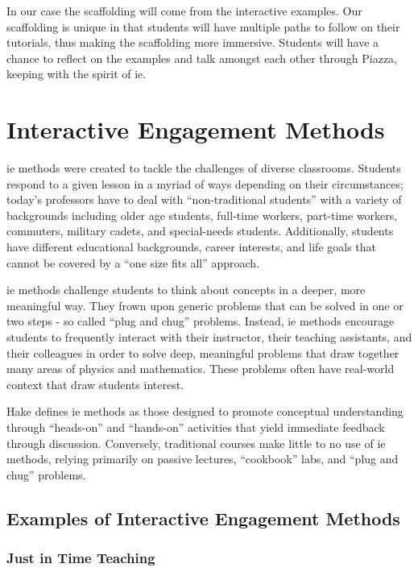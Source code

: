 In our case the scaffolding will come from the interactive examples. Our scaffolding is unique in that students will have multiple paths to follow on their tutorials, thus making the scaffolding more immersive. Students will have a chance to reflect on the examples and talk amongst each other through Piazza, keeping with the spirit of \gls{ie}.

\section{Interactive Engagement Methods}

\gls{ie} methods were created to tackle the challenges of diverse classrooms. Students respond to a given lesson in a myriad of ways depending on their circumstances; today's professors have to deal with ``non-traditional students'' with a variety of backgrounds including older age students, full-time workers, part-time workers, commuters, military cadets, and special-needs students. Additionally, students have different educational backgrounds, career interests, and life goals that cannot be covered by a ``one size fits all'' approach\cite{novak1999}.

\gls{ie} methods challenge students to think about concepts in a deeper, more meaningful way. They frown upon generic problems that can be solved in one or two steps - so called ``plug and chug'' problems. Instead, \gls{ie} methods encourage students to frequently interact with their instructor, their teaching assistants, and their colleagues in order to solve deep, meaningful problems that draw together many areas of physics and mathematics. These problems often have real-world context that draw students interest.

Hake defines \gls{ie} methods as those designed to promote conceptual understanding through ``heads-on'' and ``hands-on'' activities that yield immediate feedback through discussion. Conversely, traditional courses make little to no use of \gls{ie} methods, relying primarily on passive lectures, ``cookbook'' labs, and ``plug and chug'' problems.

\subsection{Examples of Interactive Engagement Methods}

\subsubsection{Just in Time Teaching}

